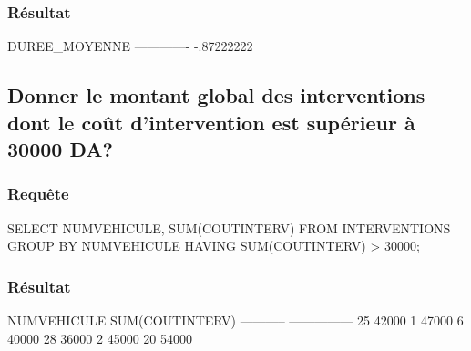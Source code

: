 \documentclass[•]{article}
\begin{document}
\subsubsection{Résultat}
\begin{sql}
    DUREE_MOYENNE                                                                   
    -------------                                                                   
       -.87222222                                                                       
\end{sql}
\subsection{Donner le montant global des interventions dont le coût d’intervention est supérieur à 30000 DA?}
\subsubsection{Requête}
\begin{sql}
SELECT NUMVEHICULE, SUM(COUTINTERV) FROM INTERVENTIONS GROUP BY NUMVEHICULE HAVING SUM(COUTINTERV) > 30000;
\end{sql}
\subsubsection{Résultat}
\begin{sql}
    NUMVEHICULE SUM(COUTINTERV)                                                     
    ----------- ---------------                                                     
             25           42000                                                     
              1           47000                                                     
              6           40000                                                     
             28           36000                                                     
              2           45000                                                     
             20           54000 
\end{sql}
\end{document}
